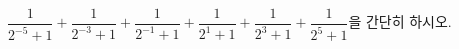 $\dfrac{1}{2^{-5}+1}+\dfrac{1}{2^{-3}+1}+\dfrac{1}{2^{-1}+1}+\dfrac{1}{2^{1}+1}+\dfrac{1}{2^{3}+1}+\dfrac{1}{2^{5}+1}$을 간단히 하시오.
